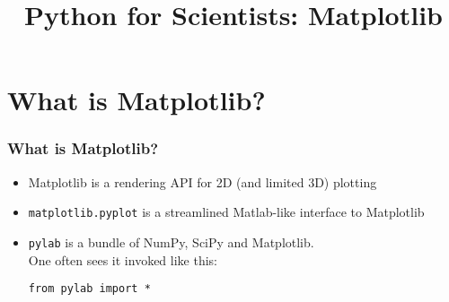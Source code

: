 \documentclass[red]{beamer}
\title{Python for Scientists: Matplotlib}
\begin{document}
\begin{frame}
    \titlepage
\end{frame}
\section[Intro]{What is Matplotlib?}
\begin{frame}[fragile]
    \frametitle{What is Matplotlib?}
    
    \begin{itemize}
        \item Matplotlib is a rendering API for 2D (and limited 3D) plotting
        \item \lstinline|matplotlib.pyplot| is a streamlined Matlab-like interface to Matplotlib
        \item \lstinline|pylab| is a bundle of NumPy, SciPy and Matplotlib.\\
        One often sees it invoked like this:
        \begin{lstlisting}
from pylab import *
        \end{lstlisting}
    \end{itemize}
\end{frame}
\end{document}
